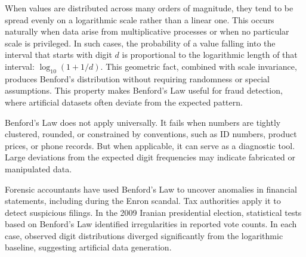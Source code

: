 When values are distributed across many orders of magnitude, they tend to be spread evenly on a logarithmic scale rather than a linear one. This occurs naturally when data arise from multiplicative processes or when no particular scale is privileged. In such cases, the probability of a value falling into the interval that starts with digit $d$ is proportional to the logarithmic length of that interval: $\log_{10}(1 + 1/d)$. This geometric fact, combined with scale invariance, produces Benford's distribution without requiring randomness or special assumptions. This property makes Benford's Law useful for fraud detection, where artificial datasets often deviate from the expected pattern.

Benford’s Law does not apply universally. It fails when numbers are tightly clustered, rounded, or constrained by conventions, such as ID numbers, product prices, or phone records. But when applicable, it can serve as a diagnostic tool. Large deviations from the expected digit frequencies may indicate fabricated or manipulated data.

Forensic accountants have used Benford's Law to uncover anomalies in financial statements, including during the Enron scandal. Tax authorities apply it to detect suspicious filings. In the 2009 Iranian presidential election, statistical tests based on Benford’s Law identified irregularities in reported vote counts. In each case, observed digit distributions diverged significantly from the logarithmic baseline, suggesting artificial data generation.

